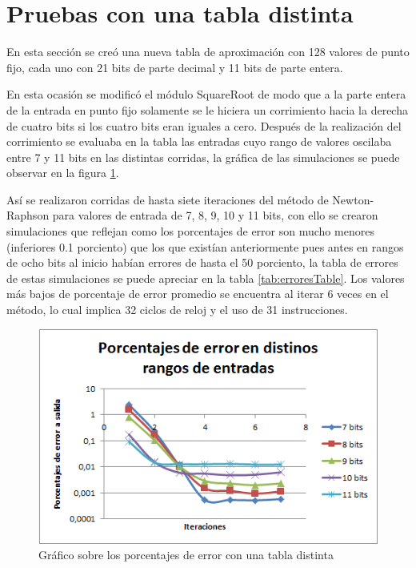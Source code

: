 \section{Pruebas con una tabla distinta}

En esta sección se creó una nueva tabla de aproximación con 128 valores de punto fijo, cada uno con 21 bits de parte decimal y 11 bits de parte entera.  

En esta ocasión se modificó el módulo SquareRoot de modo que a la parte entera de la entrada en punto fijo solamente se le hiciera un corrimiento hacia la derecha de cuatro bits si los cuatro bits eran iguales a cero. Después de la realización del corrimiento se evaluaba en la tabla las entradas cuyo rango de valores oscilaba entre 7 y 11 bits en las distintas corridas, la gráfica de las simulaciones se puede observar en la figura \ref{fig:puntos2}.

Así se realizaron corridas de hasta siete iteraciones del método de Newton-Raphson para valores de entrada de 7, 8, 9, 10 y 11 bits, con ello se crearon simulaciones que reflejan como los porcentajes de error son mucho menores (inferiores 0.1 porciento) que los que existían anteriormente pues antes en rangos de ocho bits al inicio habían errores de hasta el 50 porciento, la tabla de errores de estas simulaciones se puede apreciar en la tabla \ref{tab:erroresTable}. Los valores más bajos de porcentaje de error promedio se encuentra al iterar 6 veces en el método, lo cual implica 32 ciclos de reloj y el uso de 31 instrucciones. 

\begin{figure}
	\includegraphics[width=0.7\linewidth]{images/puntos2}
	\caption{Gráfico sobre los porcentajes de error con una tabla distinta} \label{fig:puntos2}
\end{figure}

